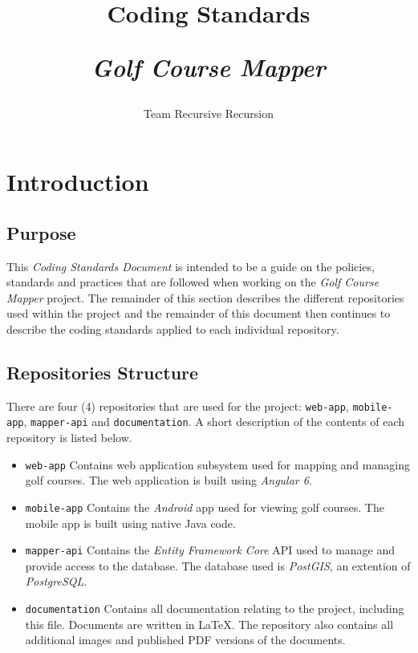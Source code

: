 \documentclass{article}
\title{
    Coding Standards\\
    \begin{large}
        \textit{Golf Course Mapper}
    \end{large}
}
\date{
    \begin{small}
        \today
    \end{small}
}
\author{
    Team Recursive Recursion
}
\begin{document}
    \maketitle
    \newpage
    
    \tableofcontents
    \newpage


    \section{Introduction}
    \label{sec:intro}

    \subsection{Purpose}
    \label{sec:purp}

    This \textit{Coding Standards Document} is intended to be a guide on the
    policies, standards and practices that are followed when working on the
    \textit{Golf Course Mapper} project. The remainder of this section describes
    the different repositories used within the project and the remainder of this
    document then continues to describe the coding standards applied to each
    individual repository.

    \subsection{Repositories Structure}
    \label{sec:reps}

    There are four (4) repositories that are used for the project:
    \texttt{web-app}, \texttt{mobile-app}, \texttt{mapper-api} and
    \texttt{documentation}. A short description of the contents of each
    repository is listed below.

    \begin{itemize}
        \item \texttt{web-app}
            \subitem Contains web application subsystem used for mapping and
            managing golf courses. The web application is built using
            \textit{Angular 6}.
        \item \texttt{mobile-app}
            \subitem Contains the \textit{Android} app used for viewing golf
            courses. The mobile app is built using native Java code.
        \item \texttt{mapper-api}
            \subitem Contains the \textit{Entity Framework Core} API used to
            manage and provide access to the database. The database used is
            \textit{PostGIS}, an extention of \textit{PostgreSQL}.
        \item \texttt{documentation}
            \subitem Contains all documentation relating to the project,
            including this file. Documents are written in \LaTeX. The repository
            also contains all additional images and published PDF versions of
            the documents.
    \end{itemize}
\end{document}
